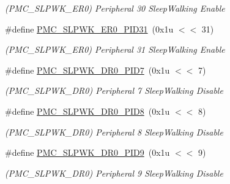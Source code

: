 \begin{DoxyCompactItemize}
\begin{DoxyCompactList}\small\item\em (P\+M\+C\+\_\+\+S\+L\+P\+W\+K\+\_\+\+E\+R0) Peripheral 30 Sleep\+Walking Enable \end{DoxyCompactList}\item 
\mbox{\label{group__SAME70__PMC_ga841bcbcd6464fffb8949804f8574657c}} 
\#define \mbox{\hyperlink{group__SAME70__PMC_ga841bcbcd6464fffb8949804f8574657c}{P\+M\+C\+\_\+\+S\+L\+P\+W\+K\+\_\+\+E\+R0\+\_\+\+P\+I\+D31}}~(0x1u $<$$<$ 31)
\begin{DoxyCompactList}\small\item\em (P\+M\+C\+\_\+\+S\+L\+P\+W\+K\+\_\+\+E\+R0) Peripheral 31 Sleep\+Walking Enable \end{DoxyCompactList}\item 
\mbox{\label{group__SAME70__PMC_ga5e9bbfee49bb688f4eeb710fa44fca20}} 
\#define \mbox{\hyperlink{group__SAME70__PMC_ga5e9bbfee49bb688f4eeb710fa44fca20}{P\+M\+C\+\_\+\+S\+L\+P\+W\+K\+\_\+\+D\+R0\+\_\+\+P\+I\+D7}}~(0x1u $<$$<$ 7)
\begin{DoxyCompactList}\small\item\em (P\+M\+C\+\_\+\+S\+L\+P\+W\+K\+\_\+\+D\+R0) Peripheral 7 Sleep\+Walking Disable \end{DoxyCompactList}\item 
\mbox{\label{group__SAME70__PMC_ga67953823b700e33d87338bf8a352e4fc}} 
\#define \mbox{\hyperlink{group__SAME70__PMC_ga67953823b700e33d87338bf8a352e4fc}{P\+M\+C\+\_\+\+S\+L\+P\+W\+K\+\_\+\+D\+R0\+\_\+\+P\+I\+D8}}~(0x1u $<$$<$ 8)
\begin{DoxyCompactList}\small\item\em (P\+M\+C\+\_\+\+S\+L\+P\+W\+K\+\_\+\+D\+R0) Peripheral 8 Sleep\+Walking Disable \end{DoxyCompactList}\item 
\mbox{\label{group__SAME70__PMC_ga948db235629c0041ccb47c795aa37ffc}} 
\#define \mbox{\hyperlink{group__SAME70__PMC_ga948db235629c0041ccb47c795aa37ffc}{P\+M\+C\+\_\+\+S\+L\+P\+W\+K\+\_\+\+D\+R0\+\_\+\+P\+I\+D9}}~(0x1u $<$$<$ 9)
\begin{DoxyCompactList}\small\item\em (P\+M\+C\+\_\+\+S\+L\+P\+W\+K\+\_\+\+D\+R0) Peripheral 9 Sleep\+Walking Disable \end{DoxyCompactList}\item 

\end{DoxyCompactItemize}
